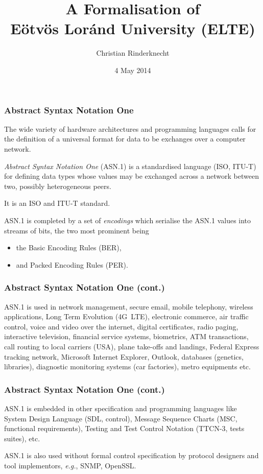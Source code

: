 \documentclass[compress,dvips,xcolor={dvipsnames},t]{beamer}
\title{A Formalisation of \ASN\\
Eötvös Loránd University (ELTE)}
\author{Christian Rinderknecht}
\date{4 May 2014}
\newcommand\ASN{\textsf{ASN.1}\xspace}
\begin{document}
\frame{\maketitle}

\begin{frame}
\frametitle{Abstract Syntax Notation One}

The wide variety of hardware architectures and programming languages
calls for the definition of a universal format for data to be
exchanges over a computer network.

\medskip

\emph{Abstract Syntax Notation One} (\ASN) is a standardised language
(ISO, ITU-T) for defining data types whose values may be exchanged
across a network between two, possibly heterogeneous peers.

\medskip

It is an ISO and ITU-T standard.

\medskip

\ASN is completed by a set of \emph{encodings} which serialise the
\ASN values into streams of bits, the two most prominent being
\begin{itemize}

  \item the Basic Encoding Rules (BER),

  \item and Packed Encoding Rules (PER).

\end{itemize}

\end{frame}

\begin{frame}
\frametitle{Abstract Syntax Notation One (cont.)}

\ASN is used in network management, secure email, mobile telephony,
wireless applications, Long Term Evolution (4G~LTE), electronic
commerce, air traffic control, voice and video over the internet,
digital certificates, radio paging, interactive television, financial
service systems, biometrics, ATM transactions, call routing to local
carriers (USA), plane take-offs and landings, Federal Express tracking
network, Microsoft Internet Explorer, Outlook, databases (genetics,
libraries), diagnostic monitoring systems (car factories), metro
equipments etc.

\end{frame}

\begin{frame}
\frametitle{Abstract Syntax Notation One (cont.)}

\ASN is embedded in other specification and programming languages like
System Design Language (SDL, control), Message Sequence Charts (MSC,
functional requirements), Testing and Test Control Notation (TTCN-3,
tests suites), etc.

\medskip

\ASN is also used without formal control specification by protocol
designers and tool implementors, \emph{e.g.}, SNMP, OpenSSL.

\end{frame}
\end{document}
